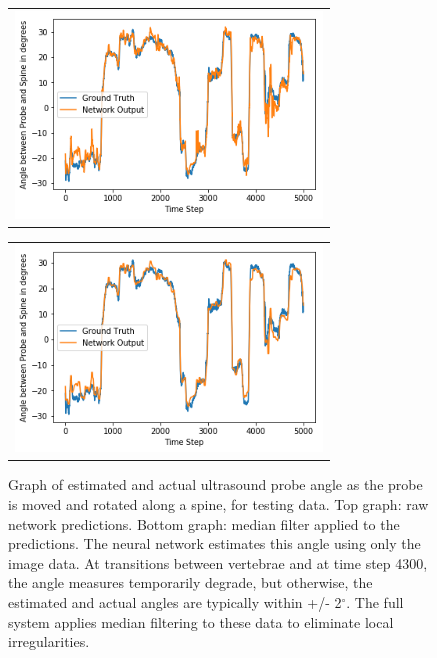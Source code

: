 \documentclass{article}
\begin{document}
\begin{figure}
\centering
\begin{tabular}{c}
\centering
\includegraphics[height=5.5cm,keepaspectratio]{NetworkOutput} 

\end{tabular}
\begin{tabular}{c}
\centering

\includegraphics[height=5.5cm,keepaspectratio]{MedFilterNetworkOutput}
\end{tabular}
\caption{Graph of estimated and actual ultrasound probe angle as the probe is moved and rotated along a spine, for testing data.  Top graph: raw network predictions.  Bottom graph: median filter applied to the predictions.  The neural network estimates this angle using only the image data.  At transitions between vertebrae and at time step 4300, the angle measures temporarily degrade, but otherwise, the estimated and actual angles are typically within +/- 2$^\circ$.  The full system applies median filtering to these data to eliminate local irregularities.
}
\end{figure}
 
\end{document}
